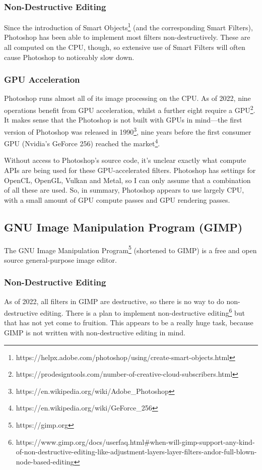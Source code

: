 \documentclass[12pt]{article}
\begin{document}
\subsubsection{Non-Destructive Editing}

Since the introduction of Smart
Objects\footnote{https://helpx.adobe.com/photoshop/using/create-smart-objects.html} (and the
corresponding Smart Filters), Photoshop has been able to implement most filters non-destructively.
These are all computed on the CPU, though, so extensive use of Smart Filters will often cause
Photoshop to noticeably slow down.

\subsubsection{GPU Acceleration}

Photoshop runs almost all of its image processing on the CPU.  As of 2022, nine operations benefit from
GPU acceleration, whilst a further eight require a
GPU\footnote{https://prodesigntools.com/number-of-creative-cloud-subscribers.html}.  It makes sense
that the Photoshop is not built with GPUs in mind---the first version of Photoshop was released in
1990\footnote{https://en.wikipedia.org/wiki/Adobe\_Photoshop}, nine years before the first consumer
GPU (Nvidia's GeForce 256) reached the market\footnote{https://en.wikipedia.org/wiki/GeForce\_256}.

Without access to Photoshop's source code, it's unclear exactly what compute APIs are being used for
these GPU-accelerated filters.  Photoshop has settings for OpenCL, OpenGL, Vulkan and Metal, so I
can only assume that a combination of all these are used.  So, in summary, Photoshop appears to use
largely CPU, with a small amount of GPU compute passes and GPU rendering passes.

\subsection{GNU Image Manipulation Program (GIMP)}

The GNU Image Manipulation Program\footnote{https://gimp.org} (shortened to GIMP) is a free and open
source general-purpose image editor.

\subsubsection{Non-Destructive Editing}

As of 2022, all filters in GIMP are destructive, so there is no way to do non-destructive editing.
There is a plan to implement non-destructive
editing\footnote{https://www.gimp.org/docs/userfaq.html\#when-will-gimp-support-any-kind-of-non-destructive-editing-like-adjustment-layers-layer-filters-andor-full-blown-node-based-editing}
but that has not yet come to fruition.  This appears to be a really huge task, because GIMP is not
written with non-destructive editing in mind.
\end{document}
